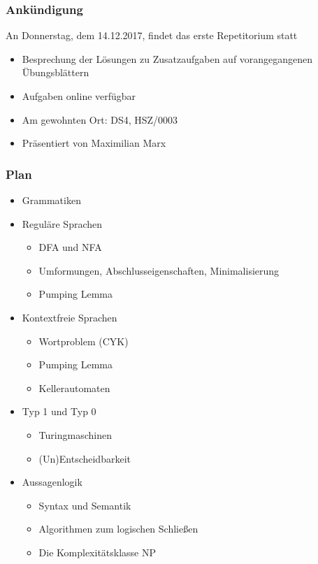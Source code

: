 \documentclass[aspectratio=1610,onlymath]{beamer}
\begin{document}
\maketitle

\begin{frame}\frametitle{Ankündigung}

\begin{center}
\alert{An Donnerstag, dem 14.12.2017, findet das erste Repetitorium statt}

\begin{itemize}
\item Besprechung der Lösungen zu Zusatzaufgaben auf vorangegangenen Übungsblättern
\item Aufgaben online verfügbar
\item Am gewohnten Ort: DS4, HSZ/0003
\item Präsentiert von Maximilian Marx
\end{itemize}

\end{center}

\end{frame}




\begin{frame}\frametitle{Plan}

\begin{itemize}
\item \alert{Grammatiken}
\item \alert{Reguläre Sprachen}
\begin{itemize}
\item DFA und NFA
\item Umformungen, Abschlusseigenschaften, Minimalisierung
\item Pumping Lemma
\end{itemize}
\item \alert{Kontextfreie Sprachen}
\begin{itemize}
\item Wortproblem (CYK)
\item Pumping Lemma
\item Kellerautomaten
\end{itemize}\pause
\item \alert{Typ 1 und Typ 0}
\begin{itemize}
\item Turingmaschinen
\item (Un)Entscheidbarkeit
\end{itemize}
\item \alert{Aussagenlogik}
\begin{itemize}
\item Syntax und Semantik
\item Algorithmen zum logischen Schließen
\item Die Komplexitätsklasse NP
\end{itemize}
\end{itemize}

\end{frame}
\end{document}
